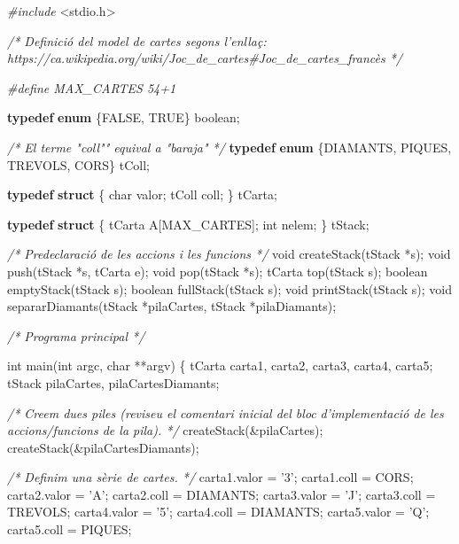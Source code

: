 \documentclass[]{book}
\newenvironment{Shaded}{\begin{snugshade}}{\end{snugshade}}
\newcommand{\KeywordTok}[1]{\textcolor[rgb]{0.13,0.29,0.53}{\textbf{#1}}}
\newcommand{\DataTypeTok}[1]{\textcolor[rgb]{0.13,0.29,0.53}{#1}}
\newcommand{\CharTok}[1]{\textcolor[rgb]{0.31,0.60,0.02}{#1}}
\newcommand{\ImportTok}[1]{#1}
\newcommand{\CommentTok}[1]{\textcolor[rgb]{0.56,0.35,0.01}{\textit{#1}}}
\newcommand{\PreprocessorTok}[1]{\textcolor[rgb]{0.56,0.35,0.01}{\textit{#1}}}
\newcommand{\NormalTok}[1]{#1}
\begin{document}
\begin{Shaded}
\begin{Highlighting}[]
\PreprocessorTok{#include }\ImportTok{<stdio.h>}

\CommentTok{/* Definició del model de cartes segons l'enllaç:}
\CommentTok{   https://ca.wikipedia.org/wiki/Joc_de_cartes#Joc_de_cartes_francès */}

\PreprocessorTok{#define MAX_CARTES 54+1}

\KeywordTok{typedef} \KeywordTok{enum}\NormalTok{ \{FALSE, TRUE\} boolean;}

\CommentTok{/* El terme "coll"" equival a "baraja" */}
\KeywordTok{typedef} \KeywordTok{enum}\NormalTok{ \{DIAMANTS, PIQUES, TREVOLS, CORS\} tColl;}

\KeywordTok{typedef} \KeywordTok{struct}\NormalTok{ \{}
    \DataTypeTok{char}\NormalTok{ valor;}
\NormalTok{    tColl coll;}
\NormalTok{\} tCarta;}

\KeywordTok{typedef} \KeywordTok{struct}\NormalTok{ \{}
\NormalTok{    tCarta A[MAX_CARTES];}
    \DataTypeTok{int}\NormalTok{ nelem;}
\NormalTok{\} tStack;}

\CommentTok{/* Predeclaració de les accions i les funcions */}
\DataTypeTok{void}\NormalTok{ createStack(tStack *s);}
\DataTypeTok{void}\NormalTok{ push(tStack *s, tCarta e);}
\DataTypeTok{void}\NormalTok{ pop(tStack *s);}
\NormalTok{tCarta top(tStack s);}
\NormalTok{boolean emptyStack(tStack s);}
\NormalTok{boolean fullStack(tStack s);}
\DataTypeTok{void}\NormalTok{ printStack(tStack s);}
\DataTypeTok{void}\NormalTok{ separarDiamants(tStack *pilaCartes, tStack *pilaDiamants);}

\CommentTok{/* Programa principal */}

\DataTypeTok{int}\NormalTok{ main(}\DataTypeTok{int}\NormalTok{ argc, }\DataTypeTok{char}\NormalTok{ **argv) \{}
\NormalTok{    tCarta carta1, carta2, carta3, carta4, carta5;}
\NormalTok{    tStack pilaCartes, pilaCartesDiamants;}
    
    \CommentTok{/* Creem dues piles (reviseu el comentari inicial del bloc}
\CommentTok{       d'implementació de les accions/funcions de la pila). */}
\NormalTok{    createStack(&pilaCartes);}
\NormalTok{    createStack(&pilaCartesDiamants);}
    
    \CommentTok{/* Definim una sèrie de cartes. */}
\NormalTok{    carta1.valor = }\CharTok{'3'}\NormalTok{;}
\NormalTok{    carta1.coll = CORS;}
\NormalTok{    carta2.valor = }\CharTok{'A'}\NormalTok{;}
\NormalTok{    carta2.coll = DIAMANTS;}
\NormalTok{    carta3.valor = }\CharTok{'J'}\NormalTok{;}
\NormalTok{    carta3.coll = TREVOLS;}
\NormalTok{    carta4.valor = }\CharTok{'5'}\NormalTok{;}
\NormalTok{    carta4.coll = DIAMANTS;}
\NormalTok{    carta5.valor = }\CharTok{'Q'}\NormalTok{;}
\NormalTok{    carta5.coll = PIQUES;}
    

\end{Highlighting}
\end{Shaded}
\end{document}
